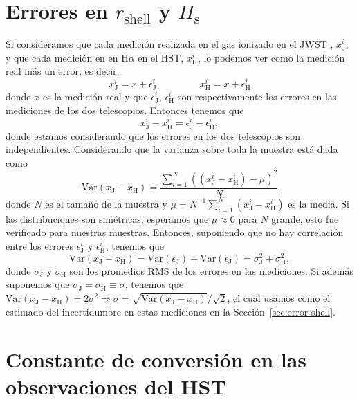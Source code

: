\documentclass{book}
\begin{document}
\chapter{Errores en $r_\mathrm{shell}$ y $H_\mathrm{s}$}\label{AP: errores r_s H_s}

Si consideramos que cada medición realizada en el gas ionizado en el
JWST , $x_\mathrm{J}^i$, y que cada medición en en H$\alpha$ en el HST,
$x_\mathrm{H}^i$, lo podemos ver como la medición real más un error,
es decir,
\begin{equation}
    x_\mathrm{J}^i=x+\epsilon_\mathrm{J}^i,  \qquad
    \qquad
    x_\mathrm{H}^i=x+\epsilon_\mathrm{H}^i
\end{equation}
donde $x$ es la medición real y que $\epsilon_\mathrm{J}^i$,
$\epsilon_\mathrm{H}^i$ son respectivamente los errores en las mediciones de
los dos telescopios. Entonces tenemos que
\begin{equation}
    x_\mathrm{J}^i-x_\mathrm{H}^i=\epsilon_\mathrm{J}^i-\epsilon_\mathrm{H}^i,
\end{equation}
donde estamos considerando que los errores en los dos telescopios son
independientes. Considerando que la varianza sobre toda la muestra
está dada como
\begin{equation}
    \mathrm{Var}(x_\mathrm{J}-x_\mathrm{H})=\frac{\sum_{i=1}^N ((x_\mathrm{J}^i-x_\mathrm{H}^i)-\mu)^2}{N}
\end{equation}
donde $N$ es el tamaño de la muestra y
$\mu = N^{-1} \sum_{i=1}^N (x_\mathrm{J}^i-x_\mathrm{H}^i)$ es la media. Si
las distribuciones son simétricas, esperamos que $\mu \approx 0$ para
$N$ grande, esto fue verificado para nuestras muestras. Entonces,
suponiendo que no hay correlación entre los errores
$\epsilon_\mathrm{J}^i$ y $\epsilon_\mathrm{H}^i$, tenemos que
\begin{equation}
    \mathrm{Var}(x_\mathrm{J}-x_\mathrm{H})=\mathrm{Var}(\epsilon_\mathrm{J})+\mathrm{Var}(\epsilon_\mathrm{J})=\sigma_\mathrm{J}^2+\sigma_\mathrm{H}^2,
\end{equation}
donde $\sigma_\mathrm{J}$ y $\sigma_\mathrm{H}$ son los promedios RMS de los
errores en las mediciones. Si además suponemos que
$\sigma_\mathrm{J} = \sigma_\mathrm{H} \equiv \sigma$, tenemos que
$\mathrm{Var}(x_\mathrm{J}-x_\mathrm{H})=2\sigma^2\Rightarrow\sigma=\sqrt{\mathrm{Var}(x_\mathrm{J}-x_\mathrm{H})}/\sqrt{2}$,
el cual usamos como el estimado del incertidumbre en estas mediciones
en la Sección~\ref{sec:error-shell}.


\chapter{Constante de conversión en las observaciones del HST} \label{AP : conversion EM}
\end{document}
